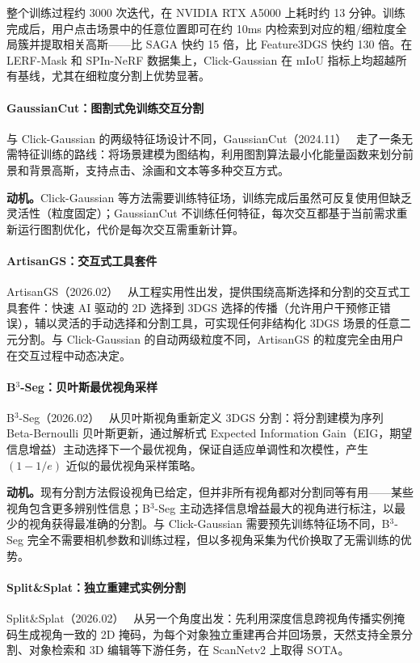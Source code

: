 整个训练过程约 3000 次迭代，在 NVIDIA RTX A5000 上耗时约 13 分钟。训练完成后，用户点击场景中的任意位置即可在约 10ms 内检索到对应的粗/细粒度全局簇并提取相关高斯——比 SAGA 快约 15 倍，比 Feature3DGS 快约 130 倍。在 LERF-Mask 和 SPIn-NeRF 数据集上，Click-Gaussian 在 mIoU 指标上均超越所有基线，尤其在细粒度分割上优势显著。

\paragraph{GaussianCut：图割式免训练交互分割} 与 Click-Gaussian 的两级特征场设计不同，GaussianCut（2024.11）~\cite{2411_07555} 走了一条无需特征训练的路线：将场景建模为图结构，利用图割算法最小化能量函数来划分前景和背景高斯，支持点击、涂画和文本等多种交互方式。

\textbf{动机。}Click-Gaussian 等方法需要训练特征场，训练完成后虽然可反复使用但缺乏灵活性（粒度固定）；GaussianCut 不训练任何特征，每次交互都基于当前需求重新运行图割优化，代价是每次交互需重新计算。

\paragraph{ArtisanGS：交互式工具套件} ArtisanGS（2026.02）~\cite{2602_10173} 从工程实用性出发，提供围绕高斯选择和分割的交互式工具套件：快速 AI 驱动的 2D 选择到 3DGS 选择的传播（允许用户干预修正错误），辅以灵活的手动选择和分割工具，可实现任何非结构化 3DGS 场景的任意二元分割。与 Click-Gaussian 的自动两级粒度不同，ArtisanGS 的粒度完全由用户在交互过程中动态决定。

\paragraph{B$^3$-Seg：贝叶斯最优视角采样} B$^3$-Seg（2026.02）~\cite{2602_17134} 从贝叶斯视角重新定义 3DGS 分割：将分割建模为序列 Beta-Bernoulli 贝叶斯更新，通过解析式 Expected Information Gain（EIG，期望信息增益）主动选择下一个最优视角，保证自适应单调性和次模性，产生 $(1-1/e)$ 近似的最优视角采样策略。

\textbf{动机。}现有分割方法假设视角已给定，但并非所有视角都对分割同等有用——某些视角包含更多辨别性信息；B$^3$-Seg 主动选择信息增益最大的视角进行标注，以最少的视角获得最准确的分割。与 Click-Gaussian 需要预先训练特征场不同，B$^3$-Seg 完全不需要相机参数和训练过程，但以多视角采集为代价换取了无需训练的优势。

\paragraph{Split\&Splat：独立重建式实例分割} Split\&Splat（2026.02）~\cite{2602_03809} 从另一个角度出发：先利用深度信息跨视角传播实例掩码生成视角一致的 2D 掩码，为每个对象独立重建再合并回场景，天然支持全景分割、对象检索和 3D 编辑等下游任务，在 ScanNetv2 上取得 SOTA。

